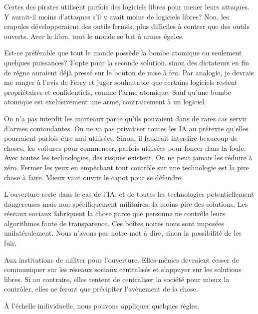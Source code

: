 \documentclass[a5paper, 10pt, twoside]{book}
\begin{document}
Certes des pirates utilisent parfois des logiciels libres pour mener
leurs attaques. Y aurait-il moins d’attaques s’il y avait moins de
logiciels libres? Non, les crapules développeraient des outils fermés,
plus difficiles à contrer que des outils ouverts. Avec le libre, tout le
monde se bat à armes égales.

Est-ce préférable que tout le monde possède la bombe atomique ou
seulement quelques puissances? J’opte pour la seconde solution, sinon
des dictateurs en fin de règne auraient déjà pressé sur le bouton de
mise à feu. Par analogie, je devrais me ranger à l’avis de Ferry et
juger souhaitable que certains logiciels restent propriétaires et
confidentiels, comme l’arme atomique. Sauf qu’une bombe atomique est
exclusivement une arme, contrairement à un logiciel.

On n’a pas interdit les marteaux parce qu’ils pouvaient dans de rares
cas servir d’armes contondantes. On ne va pas privatiser toutes les IA
au prétexte qu’elles pourraient parfois être mal utilisées. Sinon, il
faudrait interdire beaucoup de choses, les voitures pour commencer,
parfois utilisées pour foncer dans la foule. Avec toutes les
technologies, des risques existent. On ne peut jamais les réduire à
zéro. Fermer les yeux en empêchant tout contrôle sur une technologie est
la pire chose à faire. Mieux vaut ouvrir le capot pour se défendre.

L’ouverture reste dans le cas de l’IA, et de toutes les technologies
potentiellement dangereuses mais non spécifiquement militaires, la moins
pire des solutions. Les réseaux sociaux fabriquent la chose parce que
personne ne contrôle leurs algorithmes faute de transparence. Ces boîtes
noires nous sont imposées unilatéralement. Nous n’avons pas notre mot à
dire, sinon la possibilité de les fuir.

Aux institutions de militer pour l’ouverture. Elles-mêmes devraient
cesser de communiquer sur les réseaux sociaux centralisés et s’appuyer
sur les solutions libres. Si au contraire, elles tentent de centraliser
la société pour mieux la contrôler, elles ne feront que précipiter
l’avènement de la chose.

À l’échelle individuelle, nous pouvons appliquer quelques règles.
\end{document}
